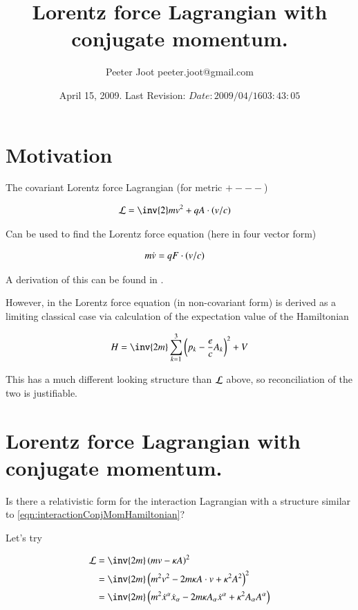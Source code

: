 \documentclass{article}
\title{ Lorentz force Lagrangian with conjugate momentum. }
\author{Peeter Joot \quad peeter.joot@gmail.com }
\date{ April 15, 2009.  Last Revision: $Date: 2009/04/16 03:43:05 $ }
\begin{document}
\maketitle{}

\section{ Motivation }

The covariant Lorentz force Lagrangian (for metric $+---$)

\begin{align}
\LL &= \inv{2} m v^2 + q A \cdot (v/c)
\end{align}

Can be used to find the Lorentz force equation (here in four vector form)

\begin{align}
m\dot{v} &= q F \cdot (v/c)
\end{align}

A derivation of this can be found in \cite{PJSrLorentzForce}.

However, in
\cite{pauli2000wm} the Lorentz force equation (in non-covariant form) is
derived as a limiting classical case via calculation of the expectation
value of the Hamiltonian

\begin{align}\label{eqn:interactionConjMomHamiltonian}
H = \inv{2m}\sum_{k=1}^3 \left(p_k - \frac{e}{c} A_k \right)^2 + V
\end{align}

This has a much different looking structure than $\mathcal{L}$ above, so reconciliation of the two
is justifiable.

\section{ Lorentz force Lagrangian with conjugate momentum. }

Is there a relativistic form for the interaction Lagrangian with a structure similar to \ref{eqn:interactionConjMomHamiltonian}?

Let's try

\begin{align*}
\LL
&= \inv{2 m}\left( m v - \kappa A \right)^2 \\
&= \inv{2 m}\left( m^2 v^2 - 2 m \kappa A \cdot v + \kappa^2 A^2 \right)^2 \\
&= \inv{2 m} \left(
m^2 \xdot^\alpha \xdot_\alpha
- 2 m \kappa A_\alpha \xdot^\alpha
+ \kappa^2 A_\alpha A^\alpha
\right) \\
\end{align*}
\end{document}
